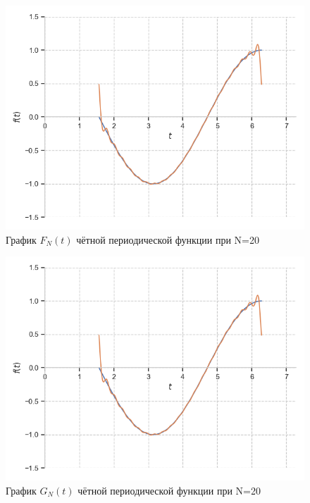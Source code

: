\documentclass[a4paper, 16pt]{article}
\begin{document}
\newpage
\vspace*{10mm}
\begin{figure}[!htb]
    \centering
    \includegraphics[scale=0.8]{fur_cos_n=20.png}
    \captionsetup{skip=0pt}
    \caption{График $F_N(t)$ чётной периодической функции при N=20}
    \label{Рис:15}
\end{figure}
\begin{figure}[!htb]
    \centering
    \includegraphics[scale=0.8]{cfur_cos_n=20.png}
    \captionsetup{skip=0pt}
    \caption{График $G_N(t)$ чётной периодической функции при N=20}
    \label{Рис:16}
\end{figure}
\newpage
\vspace*{10mm}
\end{document}
